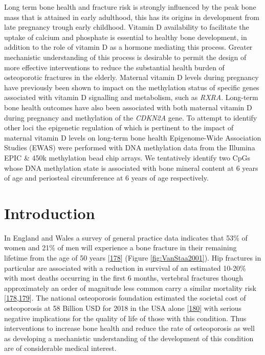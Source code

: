 \documentclass[
]{book}
\begin{document}
Long term bone health and fracture risk is strongly influenced by the peak bone mass that is attained in early adulthood, this has its origins in development from late pregnancy trough early childhood.
Vitamin D availability to facilitate the uptake of calcium and phosphate is essential to healthy bone development, in addition to the role of vitamin D as a hormone mediating this process.
Greater mechanistic understanding of this process is desirable to permit the design of more effective interventions to reduce the substantial health burden of osteoporotic fractures in the elderly.
Maternal vitamin D levels during pregnancy have previously been shown to impact on the methylation status of specific genes associated with vitamin D signalling and metabolism, such as \emph{RXRA}.
Long-term bone health outcomes have also been associated with both maternal vitamin D during pregnancy and methylation of the \emph{CDKN2A} gene.
To attempt to identify other loci the epigenetic regulation of which is pertinent to the impact of maternal vitamin D levels on long-term bone health Epigenome-Wide Association Studies (EWAS) were performed with DNA methylation data from the Illumina EPIC \& 450k methylation bead chip arrays.
We tentatively identify two CpGs whose DNA methylation state is associated with bone mineral content at 6 years of age and periosteal circumference at 6 years of age respectively.

\hypertarget{introduction-1}{%
\section{Introduction}\label{introduction-1}}

In England and Wales a survey of general practice data indicates that 53\% of women and 21\% of men will experience a bone fracture in their remaining lifetime from the age of 50 years {[}\protect\hyperlink{ref-VanStaa2001}{178}{]} (Figure \ref{fig:VanStaa2001}).
Hip fractures in particular are associated with a reduction in survival of an estimated 10-20\% with most deaths occurring in the first 6 months, vertebral fractures though approximately an order of magnitude less common carry a similar mortality risk {[}\protect\hyperlink{ref-VanStaa2001}{178},\protect\hyperlink{ref-Streubel2011}{179}{]}.
The national osteoporosis foundation estimated the societal cost of osteoporosis at 58 Billion USD for 2018 in the USA alone {[}\protect\hyperlink{ref-Thompson2018}{180}{]} with serious negative implications for the quality of life of those with this condition.
Thus interventions to increase bone health and reduce the rate of osteoporosis as well as developing a mechanistic understanding of the development of this condition are of considerable medical interest.
\end{document}
